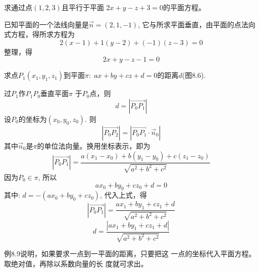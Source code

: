 \begin{example}
    求通过点$(1,2,3)$且平行于平面
$2x+y-z+3=0$的平面方程。
\end{example}

\begin{solution}
    已知平面的一个法线向量是$\vec{n}=(2,1,-1)$, 
它与所求平面垂直，由平面的点法向式方程，得所求方程为
\[2(x-1)+1(y-2)+(-1)(z-3)=0\]
整理，得
\[2x+y-z-1=0\]
\end{solution}

\begin{example}
    求点$P_1(x_1,y_1,z_1)$到平面$\pi:\; ax+by+cz+d=0$的距离$d$(图8.6).
\end{example}

\begin{figure}[htp]
    \centering
{}
    \caption{}
\end{figure}

\begin{solution}
    过$P_1$作$P_1P_0$垂直平面$\pi$
于$P_0$点，则
\[d=|\Vec{P_0P_1}|\]
设$P_0$的坐标为$(x_0,y_0,z_0)$. 则
\[|\Vec{P_0P_2}|=|\Vec{P_0P_1} \cdot \vec{n}_0|\]
其中$\vec{n}_0$是$\pi$的单位法向量。换用坐标表示，即为
\[|\Vec{P_0P_1}|=\frac{a(x_1-x_0)+b(y_1-y_0)+c(z_1-z_0)}{\sqrt{a^2+b^2+c^2}}\]
因为$P_0\in \pi$, 所以
\[ax_0+by_0+cz_0+d=0\]
其中: $d=-(ax_0+by_0+cz_0)$, 代入上式，得
\[|\Vec{P_0P_1}|=\frac{ax_1+by_1+cz_1+d}{\sqrt{a^2+b^2+c^2}}\]
\[d=\frac{|ax_1+by_1+cz_1+d|}{\sqrt{a^2+b^2+c^2}}\]
\end{solution}

例8.9说明，如果要求一点到一平面的距离，只要把这
一点的坐标代入平面方程。取绝对值，再除以系数向量的长
度就可求出。

